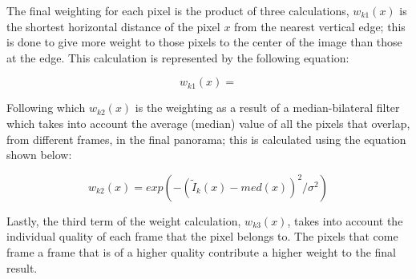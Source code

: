 The final weighting for each pixel is the product of three calculations, $w_{k1}(x)$ is the shortest horizontal 
distance of the pixel $x$ from the nearest vertical edge; this is done to give more weight to those pixels to 
the center of the image than those at the edge. This calculation is represented by the following equation:

\begin{equation}
w_{k1}(x) =  
\end{equation}

Following which $w_{k2}(x)$ is the weighting as a result of a median-bilateral filter which takes into account
the average (median) value of all the pixels that overlap, from different frames, in the final panorama; this
is calculated using the equation shown below:

\begin{equation}
w_{k2}(x) = exp(-(\tilde{I}_k(x)-med(x))^2/\sigma^2)
\end{equation}

Lastly, the third term of the weight calculation, $w_{k3}(x)$, takes into account the individual quality of 
each frame that the pixel belongs to. The pixels that come frame a frame that is of a higher quality contribute
a higher weight to the final result.

